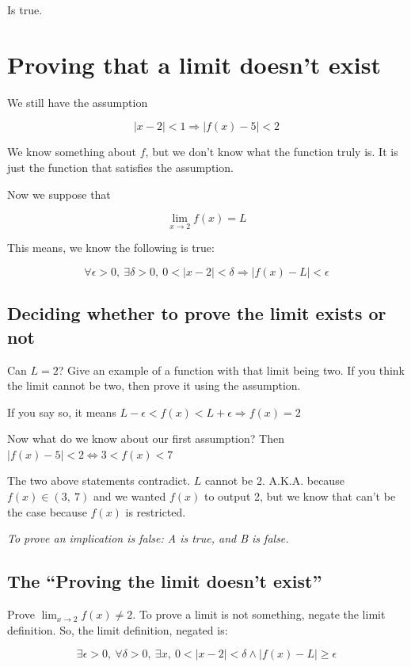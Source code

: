 \documentclass[12pt]{article}
\theoremstyle{plain}
\theoremstyle{remark}
\theoremstyle{definition}
\begin{document}
Is true.


\section{Proving that a limit doesn't
exist}

We still have the assumption

\[|x - 2| < 1 \Rightarrow \left| f(x) - 5 \right| < 2\]

We know something about \(f\), but we don't know what the function truly
is. It is just the function that satisfies the assumption.

Now we suppose that

\[\lim_{x \rightarrow 2}{f(x) = L}\]

This means, we know the following is true:

\[\forall\epsilon > 0,\ \exists\delta > 0,\ 0 < |x - 2| < \delta \Rightarrow \left| f(x) - L \right| < \epsilon\]


\subsection{Deciding whether to prove the limit exists or
not}

Can \(L = 2\)? Give an example of a function with that limit being two.
If you think the limit cannot be two, then prove it using the
assumption.

If you say so, it means
\(L - \epsilon < f(x) < L + \epsilon \Rightarrow f(x) = 2\)

Now what do we know about our first assumption? Then
\(\left| f(x) - 5 \right| < 2 \Leftrightarrow 3 < f(x) < 7\)

The two above statements contradict. \(L\) cannot be 2. A.K.A. because
\(f(x) \in (3,\ 7)\) and we wanted \(f(x)\) to output 2, but we know
that can't be the case because \(f(x)\) is restricted.

\emph{To prove an implication is false: A is true, and B is false.}


\subsection{The ``Proving the limit doesn't
exist''}

Prove \(\lim_{x \rightarrow 2}{f(x)} \neq 2\). To prove a limit is not
something, negate the limit definition. So, the limit definition,
negated is:

\[\exists\epsilon > 0,\ \forall\delta > 0,\ \exists x,\ 0 < |x - 2| < \delta \land \left| f(x) - L \right| \geq \epsilon\]
\end{document}

